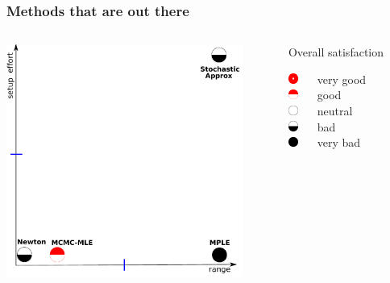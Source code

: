 \documentclass[ 10pt]{beamer}
\begin{document}
\frame
{
\frametitle{Methods that are out there}
\begin{columns}[]
\begin{column}[T]{0.7\textwidth}
\includegraphics[height=3in]{mck-final.pdf}
\end{column}
\begin{column}[t]{0.3\textwidth}
Overall satisfaction
\vspace{1mm}

\includegraphics[height=0.13in]{CR5.pdf} $\quad$ very good\\
\vspace{1mm}
\includegraphics[height=0.13in]{CR4.pdf} $\quad$ good\\
\vspace{1mm}
\includegraphics[height=0.13in]{CR3.pdf} $\quad$ neutral\\
\vspace{1mm}
\includegraphics[height=0.13in]{CR2.pdf} $\quad$ bad\\
\vspace{1mm}
\includegraphics[height=0.13in]{CR1.pdf} $\quad$ very bad\\

\end{column}
\end{columns}
}
\end{document}
